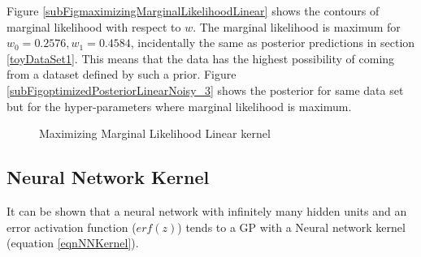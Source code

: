 Figure \ref{subFigmaximizingMarginalLikelihoodLinear} shows the contours of marginal likelihood with respect to $w$. The marginal likelihood is maximum for $w_{0} = 0.2576, w_{1} = 0.4584$, incidentally the same as posterior predictions in section \ref{toyDataSet1}. This means that the data has the highest possibility of coming from a dataset defined by such a prior. Figure \ref{subFigoptimizedPosteriorLinearNoisy_3} shows the posterior for same data set but for the hyper-parameters where marginal likelihood is maximum.

\begin{figure}[!ht]
  \centering
    \quad
{}\quad

       \caption{Maximizing Marginal Likelihood Linear kernel}
       \label{figMaximizingMLLinearKernel}
\end{figure}

\subsection{Neural Network Kernel}\label{subSecCh4NNkernel}
It can be shown that a neural network with infinitely many hidden units and an error activation function ($erf(z)$) tends to a GP with a Neural network kernel \cite{neal2012bayesian, wilson2014covariance} (equation \ref{eqnNNKernel}). 

